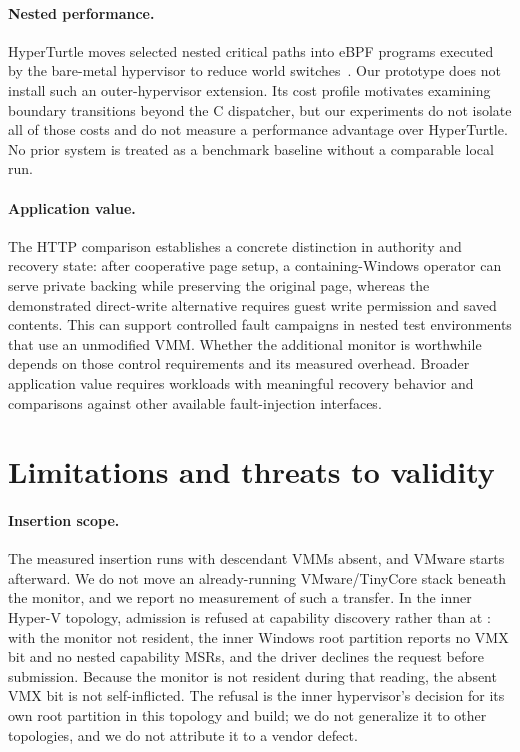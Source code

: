 \paragraph{Nested performance.}
HyperTurtle moves selected nested critical paths into eBPF programs executed by
the bare-metal hypervisor to reduce world switches~\cite{hyperturtle}. Our
prototype does not install such an outer-hypervisor extension. Its cost profile
motivates examining boundary transitions beyond the C dispatcher, but our
experiments do not isolate all of those costs and do not measure a performance
advantage over HyperTurtle. No prior system is treated as a benchmark baseline
without a comparable local run.

\paragraph{Application value.}
The HTTP comparison establishes a concrete distinction in authority and recovery
state: after cooperative page setup, a containing-Windows operator can serve
private backing while preserving the original page, whereas the demonstrated
direct-write alternative requires guest write permission and saved contents.
This can support controlled fault campaigns in nested test environments that
use an unmodified VMM. Whether the additional monitor is worthwhile depends on
those control requirements and its measured overhead. Broader application value
requires workloads with meaningful recovery behavior and comparisons against
other available fault-injection interfaces.

\section{Limitations and threats to validity}
\label{sec:limitations}
\paragraph{Insertion scope.}
The measured insertion runs with descendant VMMs absent, and VMware starts
afterward. We do not move an already-running VMware/TinyCore stack beneath the
monitor, and we report no measurement of such a transfer. In the inner Hyper-V
topology, admission is refused at capability discovery rather than at
: with the monitor not resident, the inner Windows root partition
reports no  VMX bit and no nested capability MSRs, and the
driver declines the request before submission. Because the monitor is not
resident during that reading, the absent VMX bit is not self-inflicted. The
refusal is the inner hypervisor's decision for its own root partition in this
topology and build; we do not generalize it to other topologies, and we do not
attribute it to a vendor defect.

